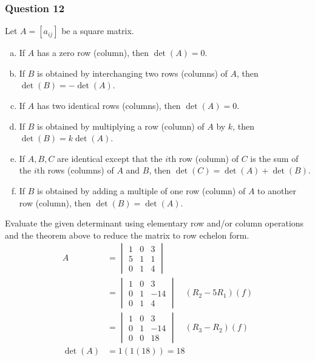 \documentclass{math}
\begin{document}
\subsubsection*{Question 12}
Let \( A = [a_{ij}] \) be a square matrix.
\begin{enumerate}[a.]
  \item If \( A \) has a zero row (column), then \( \det(A) = 0 \).
  \item If \( B \) is obtained by interchanging two rows (columns) of \( A \),
    then \( \det(B) = -\det(A) \).
  \item If \( A \) has two identical rows (columns), then \( \det(A) = 0 \).
  \item If \( B \) is obtained by multiplying a row (column) of \( A \) by
    \( k \), then \( \det(B) = k\det(A) \).
  \item If \( A,B,C \) are identical except that the \( i\text{th} \) row
    (column) of \( C \) is the sum of the \( i\text{th} \) rows (columns) of
    \( A \) and \( B \), then \( \det(C) = \det(A)+\det(B) \).
  \item If \( B \) is obtained by adding a multiple of one row (column) of
    \( A \) to another row (column), then \( \det(B) = \det(A) \).
\end{enumerate}
Evaluate the given determinant using elementary row and/or column operations and
the theorem above to reduce the matrix to row echelon form.
\begin{align*}
  A &= \begin{vmatrix}
    1 & 0 & 3 \\
    5 & 1 & 1 \\
    0 & 1 & 4
  \end{vmatrix} \\
  &= \begin{vmatrix}
    1 & 0 & 3 \\
    0 & 1 & -14 \\
    0 & 1 & 4
  \end{vmatrix} \quad (R_2-5R_1)(f) \\
  &= \begin{vmatrix}
    1 & 0 & 3 \\
    0 & 1 & -14 \\
    0 & 0 & 18
  \end{vmatrix} \quad (R_3-R_2)(f) \\
  \det(A) &= 1(1(18)) = 18
\end{align*}
\end{document}
